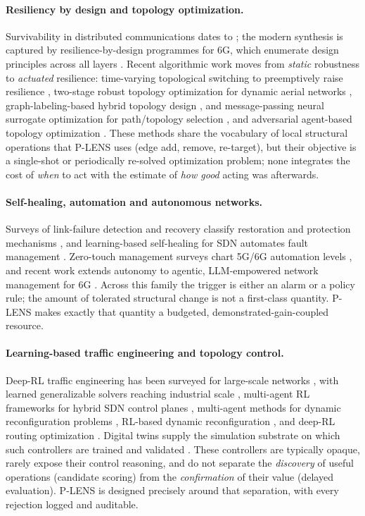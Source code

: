 \documentclass[runningheads]{llncs}
\begin{document}
\paragraph{Resiliency by design and topology optimization.}
Survivability in distributed communications dates to \cite{baran1964}; the
modern synthesis is captured by resilience-by-design programmes for 6G,
which enumerate design principles across all layers \cite{resiliencebydesign2024}.
Recent algorithmic work moves from \emph{static} robustness to \emph{actuated}
resilience: time-varying topological switching to preemptively raise
resilience \cite{chen2026switching}, two-stage robust topology optimization
for dynamic aerial networks \cite{zhang2026uav}, graph-labeling-based hybrid
topology design \cite{naqvi2025}, and message-passing neural surrogate
optimization for path/topology selection \cite{ali2025}, and adversarial
agent-based topology optimization \cite{nguyen2026}. These methods share
the vocabulary of local structural operations that P-LENS uses (edge add,
remove, re-target), but their objective is a single-shot or periodically
re-solved optimization problem; none integrates the cost of \emph{when} to
act with the estimate of \emph{how good} acting was afterwards.

\paragraph{Self-healing, automation and autonomous networks.}
Surveys of link-failure detection and recovery classify restoration and
protection mechanisms \cite{alhiyari2025}, and learning-based self-healing
for SDN automates fault management \cite{makiyah2026}. Zero-touch management
surveys chart 5G/6G automation levels \cite{riggio2022}, and recent work
extends autonomy to agentic, LLM-empowered network management for 6G
\cite{ullah2025,ferrag2026}. Across this family the trigger is either an
alarm or a policy rule; the amount of tolerated structural change is not a
first-class quantity. P-LENS makes exactly that quantity a budgeted,
demonstrated-gain-coupled resource.

\paragraph{Learning-based traffic engineering and topology control.}
Deep-RL traffic engineering has been surveyed for large-scale networks
\cite{saadi2025}, with learned generalizable solvers reaching industrial
scale \cite{telgen2025}, multi-agent RL frameworks for hybrid SDN control
planes \cite{guo2024}, multi-agent methods for dynamic reconfiguration
problems \cite{si2024}, RL-based dynamic reconfiguration \cite{chu2025}, and
deep-RL routing optimization \cite{song2026}. Digital twins supply the
simulation substrate on which such controllers are trained and validated
\cite{xu2023,tran2025,hassija2024}. These controllers are typically opaque,
rarely expose their control reasoning, and do not separate the
\emph{discovery} of useful operations (candidate scoring) from the
\emph{confirmation} of their value (delayed evaluation). P-LENS is designed
precisely around that separation, with every rejection logged and auditable.
\end{document}
